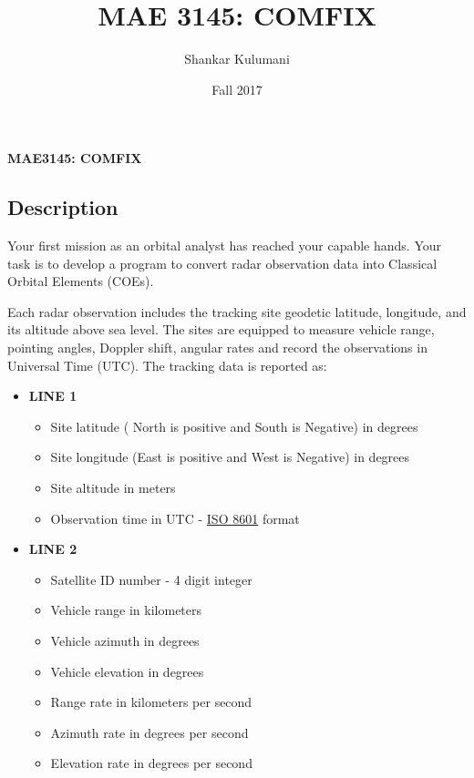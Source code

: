 \documentclass[11pt, reqno]{article}    %
\title{MAE 3145: COMFIX}
\author{Shankar Kulumani}
\date{Fall 2017}                          %
\begin{document}
\begin{center}
{\Large \textbf{MAE3145: COMFIX}}
\end{center}
\subsection*{Description}
Your first mission as an orbital analyst has reached your capable hands.
Your task is to develop a program to convert radar observation data into Classical Orbital Elements (COEs).

Each radar observation includes the tracking site geodetic latitude, longitude, and its altitude above sea level.
The sites are equipped to measure vehicle range, pointing angles, Doppler shift, angular rates and record the observations in Universal Time (UTC).
The tracking data is reported as:
\begin{itemize}
    \item \textbf{LINE 1}
        \begin{itemize}
            \item Site latitude ( North is positive and South is Negative) in degrees
            \item Site longitude (East is positive and West is Negative) in degrees
            \item Site altitude in meters
            \item Observation time in UTC - \href{https://en.wikipedia.org/wiki/ISO_8601}{ISO 8601} format
        \end{itemize}
    \item \textbf{LINE 2}
        \begin{itemize}
            \item Satellite ID number - 4 digit integer
            \item Vehicle range in kilometers
            \item Vehicle azimuth in degrees
            \item Vehicle elevation in degrees
            \item Range rate in kilometers per second
            \item Azimuth rate in degrees per second
            \item Elevation rate in degrees per second
        \end{itemize}
\end{itemize}
\end{document}
